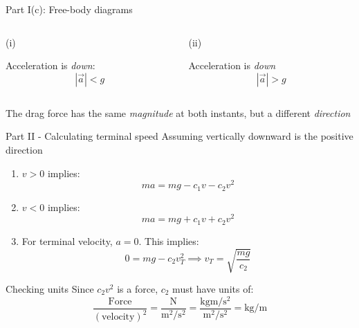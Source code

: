 \documentclass{beamer}
\begin{document}
\begin{frame}
  {Part \textrm{I}(c): Free-body diagrams}
  \begin{columns}
    \begin{column}{0.5\textwidth}
      (i)
      \begin{center}
      \end{center}
      Acceleration is \textit{down}:
      \[
        \left|\vec{a}\right| < g
      \]
    \end{column}
    \begin{column}{0.5\textwidth}
      (ii)
      \begin{center}
      \end{center}
      Acceleration is \textit{down}
      \[
        \left|\vec{a}\right| > g
      \]
    \end{column}
  \end{columns}
  \begin{block}
    The drag force has the same \textit{magnitude} at both instants, but a different \textit{direction}
  \end{block}
\end{frame}

\begin{frame}
  {Part \textrm{II} - Calculating terminal speed}
  Assuming vertically downward is the positive direction
  \begin{enumerate}[label=(\alph*)]
    \item $v>0$ implies:
    \[ ma = mg - c_1 v - c_2 v^2 \]
    \item $v<0$ implies:
    \[ ma = mg + c_1 v + c_2 v^2 \]
    \item For terminal velocity, $a=0$. This implies:
    \[
      0 = mg - c_2 v_T^2 \implies v_T = \sqrt{\frac{mg}{c_2}}
    \]
  \end{enumerate}
  \begin{exampleblock}
    {Checking units}
    Since $c_2 v^2$ is a force, $c_2$ must have units of:
    \[
      \frac{\text{Force}}{(\text{velocity})^2} =
      \frac{\si{\newton}}{\si{\meter^2\per\second^2}}
      = \frac{\si{\kilo\gram\meter\per\second^2}}{\si{\meter^2\per\second^2}} = \si{\kilo\gram\per\meter}
    \]
  \end{exampleblock}
\end{frame}
\end{document}
